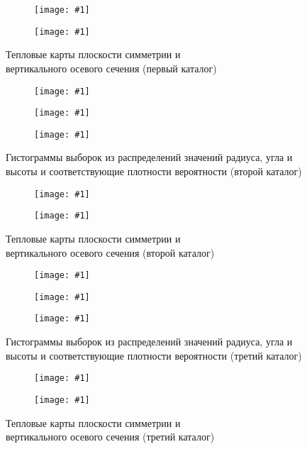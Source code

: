 \documentclass[a4paper, oneside]{article}
\newlength{\imagewidth}
\newlength{\imageheight}
\newcommand{\subgraphics}[1]{
\settowidth{\imagewidth}{\texttt{[image: \#1]}}%
\begin{subfigure}{\imagewidth}%
    \texttt{[image: \#1]}%
\end{subfigure}%
}
\begin{document}
\begin{figure}[h!]
  \centering
  \setlength{\imageheight}{5.1cm}
  \subgraphics{exponential_disk/1/Heatmap Symmetry Plane}
  \subgraphics{exponential_disk/1/Heatmap Vertical Cut}
  \caption{Тепловые карты плоскости симметрии и \\ вертикального осевого сечения (первый каталог)}
\end{figure}

\newpage

\begin{figure}[h!]
  \centering
  \setlength{\imageheight}{4.07cm}
  \subgraphics{exponential_disk/2/Histogram R}
  \subgraphics{exponential_disk/2/Histogram θ}
  \subgraphics{exponential_disk/2/Histogram Z}
  \caption{Гистограммы выборок из распределений значений радиуса, угла и высоты и соответствующие плотности вероятности (второй каталог)}
\end{figure}

\begin{figure}[h!]
  \centering
  \setlength{\imageheight}{5.1cm}
  \subgraphics{exponential_disk/2/Heatmap Symmetry Plane}
  \subgraphics{exponential_disk/2/Heatmap Vertical Cut}
  \caption{Тепловые карты плоскости симметрии и \\ вертикального осевого сечения (второй каталог)}
\end{figure}

\begin{figure}[h!]
  \centering
  \setlength{\imageheight}{4.07cm}
  \subgraphics{exponential_disk/3/Histogram R}
  \subgraphics{exponential_disk/3/Histogram θ}
  \subgraphics{exponential_disk/3/Histogram Z}
  \caption{Гистограммы выборок из распределений значений радиуса, угла и высоты и соответствующие плотности вероятности (третий каталог)}
\end{figure}

\newpage

\begin{figure}[h!]
  \centering
  \setlength{\imageheight}{5.1cm}
  \subgraphics{exponential_disk/3/Heatmap Symmetry Plane}
  \subgraphics{exponential_disk/3/Heatmap Vertical Cut}
  \caption{Тепловые карты плоскости симметрии и \\ вертикального осевого сечения (третий каталог)}
\end{figure}
\end{document}
